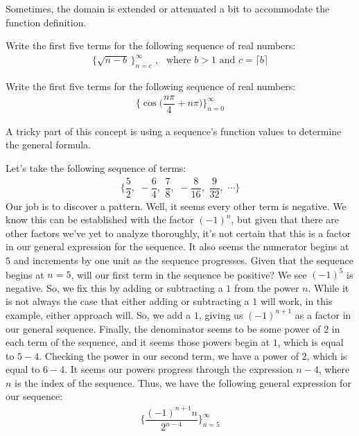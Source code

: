 Sometimes, the domain is extended or attenuated a bit to accommodate the function definition.

\begin{exercise}
Write the first five terms for the following sequence of real numbers:
\begin{align*}
    \{\sqrt{n-b} \hspace{2pt}\}_{n=c}^{\infty} \hspace{4pt} \text{,} \hspace{10pt} \text{where $b > 1$ and $c = \lceil b \rceil$}
\end{align*}
\end{exercise}

\begin{exercise}
Write the first five terms for the following sequence of real numbers:
\begin{align*}
    \Big\{\cos{\Big(\dfrac{n\pi}{4} + n \pi \Big)}\Big\}_{n=0}^{\infty}
\end{align*}
\end{exercise}

A tricky part of this concept is using a sequence's function values to determine the general formula.

\begin{example}
Let's take the following sequence of terms:
\begin{align*}
    \Big\{\dfrac{5}{2}, \hspace{4pt} -\dfrac{6}{4}, \hspace{4pt} \dfrac{7}{8}, \hspace{4pt} -\dfrac{8}{16}, \hspace{4pt} \dfrac{9}{32}, \hspace{4pt} \cdots \Big\}
\end{align*}
Our job is to discover a pattern. Well, it seems every other term is negative. We know this can be established with the factor $(-1)^{n}$, but given that there are other factors we've yet to analyze thoroughly, it's not certain that this is a factor in our general expression for the sequence. It also seems the numerator begins at $5$ and increments by one unit as the sequence progresses. Given that the sequence begins at $n=5$, will our first term in the sequence be positive? We see $(-1)^{5}$ is negative. So, we fix this by adding or subtracting a $1$ from the power $n$. While it is not always the case that either adding or subtracting a $1$ will work, in this example, either approach will. So, we add a $1$, giving us $(-1)^{n+1}$ as a factor in our general sequence. Finally, the denominator seems to be some power of $2$ in each term of the sequence, and it seems those powers begin at $1$, which is equal to $5-4$. Checking the power in our second term, we have a power of $2$, which is equal to $6-4$. It seems our powers progress through the expression $n-4$, where $n$ is the index of the sequence. Thus, we have the following general expression for our sequence:
\begin{align*}
    \Big\{\dfrac{(-1)^{n+1}n}{2^{n-4}}\Big\}_{n=5}^{\infty}
\end{align*}
\end{example}

